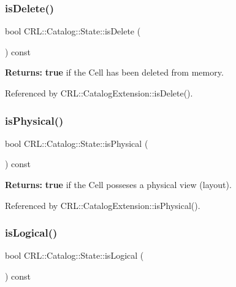 \subsubsection{\texorpdfstring{is\+Delete()}{isDelete()}}
{\footnotesize\ttfamily bool C\+R\+L\+::\+Catalog\+::\+State\+::is\+Delete (\begin{DoxyParamCaption}{ }\end{DoxyParamCaption}) const\hspace{0.3cm}{\ttfamily [inline]}}

{\bfseries Returns\+:} {\bfseries true} if the Cell has been deleted from memory. 

Referenced by C\+R\+L\+::\+Catalog\+Extension\+::is\+Delete().

\mbox{\label{classCRL_1_1Catalog_1_1State_a72b60d86f25221fd8fe7a5902be528a2}} 
\subsubsection{\texorpdfstring{is\+Physical()}{isPhysical()}}
{\footnotesize\ttfamily bool C\+R\+L\+::\+Catalog\+::\+State\+::is\+Physical (\begin{DoxyParamCaption}{ }\end{DoxyParamCaption}) const\hspace{0.3cm}{\ttfamily [inline]}}

{\bfseries Returns\+:} {\bfseries true} if the Cell posseses a physical view (layout). 

Referenced by C\+R\+L\+::\+Catalog\+Extension\+::is\+Physical().

\mbox{\label{classCRL_1_1Catalog_1_1State_a07aad28830a57090cf9203b0ff8714b1}} 
\subsubsection{\texorpdfstring{is\+Logical()}{isLogical()}}
{\footnotesize\ttfamily bool C\+R\+L\+::\+Catalog\+::\+State\+::is\+Logical (\begin{DoxyParamCaption}{ }\end{DoxyParamCaption}) const\hspace{0.3cm}{\ttfamily [inline]}}

